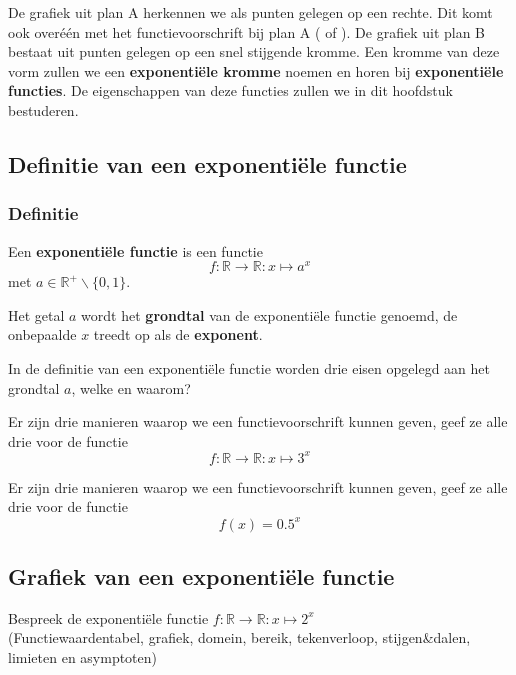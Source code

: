 \documentclass[12pt,twoside,a4paper]{article}
\begin{document}
De grafiek uit plan A herkennen we als punten gelegen op een rechte. Dit komt ook overéén met het functievoorschrift bij plan A (\arule{5cm} of \arule{5cm}). De grafiek uit plan B bestaat uit punten gelegen op een snel stijgende kromme. Een kromme van deze vorm zullen we een {\bf exponentiële kromme} noemen en horen bij {\bf exponentiële functies}. De eigenschappen van deze functies zullen we in dit hoofdstuk bestuderen.

\subsection{Definitie van een exponentiële functie}

\subsubsection*{Definitie}
\begin{mdframed}
Een {\bf exponentiële functie} is een functie
$$f:\mathbb{R}\to\mathbb{R}: x\mapsto a^x$$
met $a\in\mathbb{R}^+\backslash\{0,1\}$.
\end{mdframed}

Het getal $a$ wordt het {\bf grondtal} van de exponentiële functie genoemd, de onbepaalde $x$ treedt op als de {\bf exponent}.

\begin{oefening}
In de definitie van een exponentiële functie worden drie eisen opgelegd aan het grondtal $a$, welke en waarom?
\end{oefening}

\begin{oefening}
Er zijn drie manieren waarop we een functievoorschrift kunnen geven, geef ze alle drie voor de functie
$$f:\mathbb{R}\to\mathbb{R}: x\mapsto 3^x$$
\end{oefening}

\vspace*{-0.75cm}
\begin{oefening}
Er zijn drie manieren waarop we een functievoorschrift kunnen geven, geef ze alle drie voor de functie
$$f(x)=0.5^x$$
\end{oefening}

\subsection{Grafiek van een exponentiële functie}

\begin{oefening}
Bespreek de exponentiële functie $f:\mathbb{R}\to\mathbb{R}: x\mapsto 2^x$\\
(Functiewaardentabel, grafiek, domein, bereik, tekenverloop, stijgen\&dalen, limieten en asymptoten)
\end{oefening}
\end{document}
